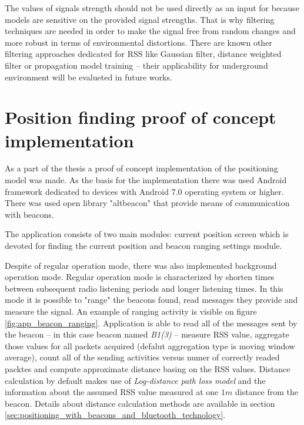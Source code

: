 \documentclass[../main.tex]{subfiles}
\begin{document}
The values of signals strength should not be used directly as an input for because models are sensitive on the provided signal strengths. That is why filtering techniques are needed in order to make the signal free from random changes and more robust in terms of environmental distortions. There are known other filtering approaches dedicated for RSS like Gaussian filter, distance weighted filter or propagation model training \cite{article_rssi_learning_and_filtering_for_navi} -- their applicability for underground environment will be evalueted in future works.


\section{Position finding proof of concept implementation} %
\label{sec:simple_position_finding_algorithm_implementation}

As a part of the thesis a proof of concept implementation of the positioning model was made. As the basis for the implementation there was used Android framework dedicated to devices with Android 7.0 operating system or higher. There was used open library "altbeacon" that provide means of communication with beacons.

The application consists of two main modules: current position screen which is devoted for finding the current position and beacon ranging settings module.

Despite of regular operation mode, there was also implemented background operation mode. Regular operation mode is characterized by shorten times between subsequent radio listening periods and longer listening times. In this mode it is possible to "range" the beacons found, read messages they provide and measure the signal. An example of ranging activity is visible on figure \ref{fig:app_beacon_ranging}. Application is able to read all of the messages sent by the beacon -- in this case beacon named \textit{B1(3)} -- measure RSS value, aggregate those values for all packets acquired (defalut aggregation type is moving window average), count all of the sending activities versus numer of correctly readed packtes and compute approximate distance basing on the RSS values. Distance calculation by default makes use of \textit{Log-distance path loss model} and the information about the assumed RSS value measured at one $1m$ distance from the beacon. Details about distance calculation methods are available in section \ref{sec:positioning_with_beacons_and_bluetooth_technology}.
\end{document}
